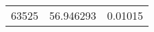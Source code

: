 \documentclass[a4paper,9pt]{beamer}
\begin{document}
{\begin{table}[htbp]
\begin{minipage}{0.5\linewidth}
\begin{tabular}{|l|l|l|}
    \hline
  \end{tabular}
  \end{minipage}
  \begin{minipage}{0.4\linewidth}%
  \begin{tabular}{|l|l|l|}
    \hline    
63525&56.946293&0.01015\\

\end{tabular}
\end{minipage}
\end{table}}
\end{document}
